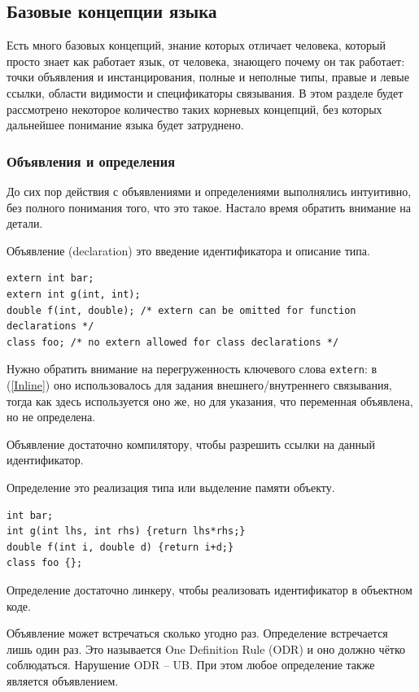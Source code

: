 \documentclass[a4paper,12pt,oneside]{article}
\begin{document}
\pagebreak
\subsection{Базовые концепции языка}\label{BasicTerms}

Есть много базовых концепций, знание которых отличает человека, который просто знает как работает язык, от человека, знающего почему он так работает: точки объявления и инстанцирования, полные и неполные типы, правые и левые ссылки, области видимости и спецификаторы связывания. В этом разделе будет рассмотрено некоторое количество таких корневых концепций, без которых дальнейшее понимание языка будет затруднено.

\subsubsection{Объявления и определения}\label{DeclVsDef}

До сих пор действия с объявлениями и определениями выполнялись интуитивно, без полного понимания того, что это такое. Настало время обратить внимание на детали.

Объявление (declaration) это введение идентификатора и описание типа.

\begin{lstlisting}
extern int bar;
extern int g(int, int);
double f(int, double); /* extern can be omitted for function declarations */
class foo; /* no extern allowed for class declarations */
\end{lstlisting}

Нужно обратить внимание на перегруженность ключевого слова \lstinline!extern!: в (\ref{Inline}) оно использовалось для задания внешнего/внутреннего связывания, тогда как здесь используется оно же, но для указания, что переменная объявлена, но не определена.

Объявление достаточно компилятору, чтобы разрешить ссылки на данный идентификатор. 

Определение это реализация типа или выделение памяти объекту.

\begin{lstlisting}
int bar;
int g(int lhs, int rhs) {return lhs*rhs;}
double f(int i, double d) {return i+d;}
class foo {};
\end{lstlisting}

Определение достаточно линкеру, чтобы реализовать идентификатор в объектном коде. 

Объявление может встречаться сколько угодно раз. Определение встречается лишь один раз. Это называется One Definition Rule (ODR) и оно должно чётко соблюдаться. Нарушение ODR -- UB. При этом любое определение также является объявлением.
\end{document}
